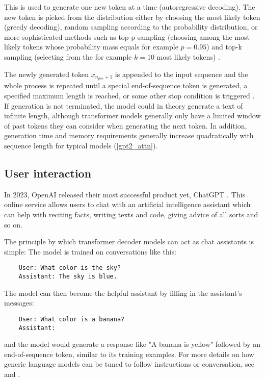 This is used to generate one new token at a time (autoregressive decoding). The new token is picked from the distribution either by choosing the most likely token (greedy decoding), random sampling according to the probability distribution, or more sophisticated methods such as top-p sampling (choosing among the most likely tokens whose probability mass equals for example $p=0.95$) and top-k sampling (selecting from the for example $k=10$ most likely tokens) \cite{ippolito2019comparison}.

The newly generated token $x_{n_{pos}+1}$ is appended to the input sequence and the whole process is repeated until a special end-of-sequence token is generated, a specified maximum length is reached, or some other stop condition is triggered \cite[sect. "Generation"]{HuggingFaceGPT2}. If generation is not terminated, the model could in theory generate a text of infinite length, although transformer models generally only have a limited window of past tokens they can consider when generating the next token. In addition, generation time and memory requirements generally increase quadratically with sequence length for typical models (\cref{gpt2_attn}).

\subsection{User interaction}

In 2023, OpenAI released their most successful product yet, ChatGPT \cite{openai_chatgpt_2022}. This online service allows users to chat with an artificial intelligence assistant which can help with reciting facts, writing texts and code, giving advice of all sorts and so on.

The principle by which transformer decoder models can act as chat assistants is simple: The model is trained on conversations like this:

\begin{verbatim}
    User: What color is the sky?
    Assistant: The sky is blue.
\end{verbatim}

The model can then become the helpful assistant by filling in the assistant's messages:

\begin{verbatim}
    User: What color is a banana?
    Assistant:
\end{verbatim}

and the model would generate a response like "A banana is yellow" followed by an end-of-sequence token, similar to its training examples. For more details on how generic language models can be tuned to follow instructions or conversation, see \cite{yi2019coherent} and \cite{ouyang2022training}.

